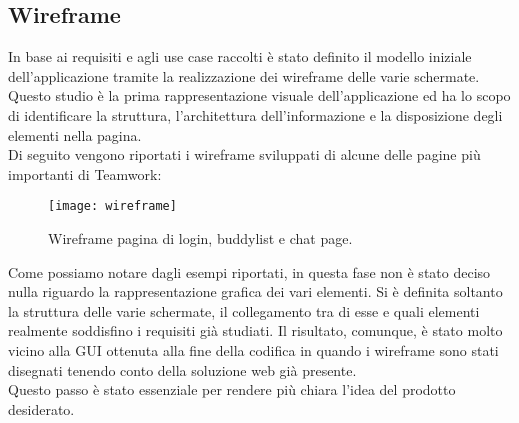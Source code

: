 \subsection{Wireframe}
In base ai requisiti e agli use case raccolti è stato definito il modello iniziale
 dell'applicazione tramite la realizzazione dei wireframe delle varie schermate. \\
Questo studio è la prima rappresentazione visuale dell'applicazione ed ha lo 
scopo di identificare la struttura, l'architettura dell'informazione e la 
disposizione degli elementi nella pagina.\\
Di seguito vengono riportati i wireframe sviluppati di alcune delle pagine più 
importanti di Teamwork:
\begin{figure}[H] 
	\centering
	\texttt{[image: wireframe]}
	\caption{Wireframe pagina di login, buddylist e chat page.}
\end{figure}
Come possiamo notare dagli esempi riportati, in questa fase non è stato deciso 
nulla riguardo la rappresentazione grafica dei vari elementi. 
Si è definita soltanto la struttura delle varie schermate, il collegamento tra 
di esse e quali elementi realmente soddisfino i requisiti già studiati. 
Il risultato, comunque, è stato molto vicino alla GUI ottenuta alla fine della 
codifica in quando i wireframe sono stati disegnati tenendo conto della 
soluzione web già presente.\\ 
Questo passo è stato essenziale per rendere più chiara l'idea del prodotto desiderato.

